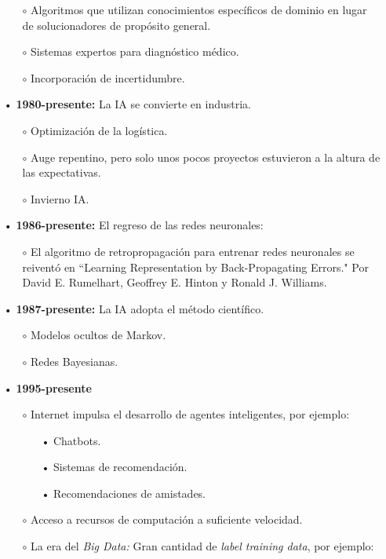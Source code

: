 \documentclass[12pt,a4paper]{book}
\begin{document}
\begin{enumerate}
 \begin{enumerate}
 \item[$\circ$] Algoritmos que utilizan conocimientos específicos de dominio en lugar de solucionadores de propósito general.
 \item[$\circ$] Sistemas expertos para diagnóstico médico.
 \item[$\circ$] Incorporación de incertidumbre.
 \end{enumerate}
\item[•] \textbf{1980-presente:} La IA se convierte en industria.
 \begin{enumerate}
 \item[$\circ$]Optimización de la logística.
 \item[$\circ$]Auge repentino, pero solo unos pocos proyectos estuvieron a la altura de las expectativas.
 \item[$\circ$]Invierno IA.
 \end{enumerate}    
\item[•] \textbf{1986-presente:} El regreso de las redes neuronales:
 \begin{enumerate}
 \item[$\circ$] El algoritmo de retropropagación para entrenar redes neuronales se reiventó en ``Learning Representation by Back-Propagating Errors." Por David E. Rumelhart, Geoffrey E. Hinton y Ronald J. Williams.
 \end{enumerate}
\item[•] \textbf{1987-presente:} La IA adopta el método científico.
 \begin{enumerate}
 \item[$\circ$] Modelos ocultos de Markov.
 \item[$\circ$] Redes Bayesianas.
 \end{enumerate}
\item[•] \textbf{1995-presente}
 \begin{enumerate}
 \item[$\circ$] Internet impulsa el desarrollo de agentes inteligentes, por ejemplo:
  \begin{enumerate}
   \item[•] Chatbots.
   \item[•] Sistemas de recomendación.
   \item[•] Recomendaciones de amistades.
  \end{enumerate}
  \item[$\circ$] Acceso a recursos de computación a suficiente velocidad.
  \item[$\circ$] La era del \textsl{Big Data:} Gran cantidad de \textsl{label training data}, por ejemplo:

\end{enumerate}
\end{enumerate}
\end{document}
